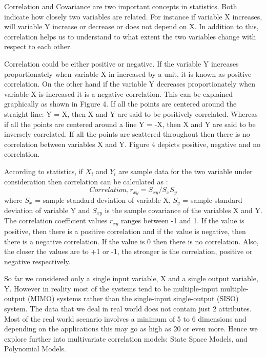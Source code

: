 \documentclass[article,type=msc,colorback,12pt,accentcolor=tud7b]{tudthesis}
\begin{document}
	Correlation and Covariance are two important concepts in statistics. Both indicate how closely two variables are related. For instance if variable X increases, will variable Y increase or decrease or does not depend on X. In addition to this, correlation helps us to understand to what extent the two variables change with respect to each other. 

\par
Correlation could be either positive or negative. If the variable Y increases proportionately when variable X in increased by a unit, it is known as positive correlation. On the other hand if the variable Y decreases proportionately when variable X is increased it is a negative correlation. This can be explained graphically as shown in Figure 4. If all the points are centered around the straight line: Y = X, then X and Y are said to be positively correlated. Whereas if all the points are centered around a line Y = -X, then X and Y are said to be inversely correlated. If all the points are scattered throughout then there is no correlation between variables X and Y. Figure 4 depicts positive, negative and no correlation.

\par
According to statistics, if $X_i$ and $Y_i$ are sample data for the two variable under consideration then correlation can be calculated as \cite{correlation}: $$ Correlation, r_{xy} = S_{xy} / S_x S_y $$ where $S_x$ = sample standard deviation of variable X, $S_y$ = sample standard deviation of variable Y and $S_{xy}$ is the sample covariance of the variables X and Y. The correlation coefficient values $r_{xy}$ ranges between -1 and 1. If the value is positive, then there is a positive correlation and if the value is negative, then there is a negative correlation. If the value is 0 then there is no correlation. Also, the closer the values are to +1 or -1, the stronger is the correlation, positive or negative respectively.
\par
So far we considered only a single input variable, X and a single output variable, Y. However in reality most of the systems tend to be multiple-input multiple-output (MIMO) systems rather than the single-input single-output (SISO) system. The data that we deal in real world does not contain just 2 attributes. Most of the real world scenario involves a minimum of 5 to 6 dimensions and depending on the applications this may go as high as 20 or even more. Hence we explore further into multivariate correlation models: State Space Models, and Polynomial Models.
\end{document}
